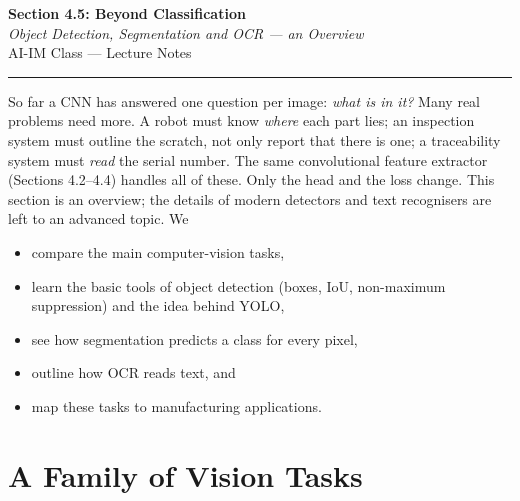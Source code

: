 \documentclass[12pt, a4paper]{article}
\begin{document}
\begin{center}
  {\LARGE \textbf{Section 4.5: Beyond Classification}} \\[0.3em]
  {\large\itshape Object Detection, Segmentation and OCR --- an Overview} \\[0.5em]
  {\large AI-IM Class --- Lecture Notes}%
  \ifstudentmode
  \fi
\end{center}

\vspace{1em}
\hrule
\vspace{1.5em}

So far a CNN has answered one question per image: \emph{what is in it?}
Many real problems need more. A robot must know \emph{where} each part lies; an
inspection system must outline the scratch, not only report that there is
one; a traceability system must \emph{read} the serial number. The same
convolutional feature extractor (Sections 4.2--4.4) handles all of these. Only
the head and the loss change. This section is an overview; the details of
modern detectors and text recognisers are left to an advanced topic. We
\begin{itemize}[nosep]
  \item compare the main computer-vision tasks,
  \item learn the basic tools of object detection (boxes, IoU, non-maximum
        suppression) and the idea behind YOLO,
  \item see how segmentation predicts a class for every pixel,
  \item outline how OCR reads text, and
  \item map these tasks to manufacturing applications.
\end{itemize}

\section{A Family of Vision Tasks}
\end{document}

